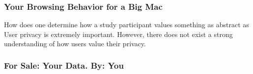 \subsubsection{Your Browsing Behavior for a Big Mac}
How does one determine how a study participant values something as abstract as 
User privacy is extremely important.
However, there does not exist a strong understanding of how users value their privacy.

\subsubsection{For Sale: Your Data. By: You}
\cite{Riederer:2011ta}





